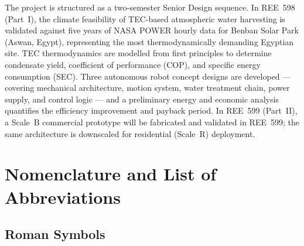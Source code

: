 \documentclass[12pt,a4paper]{report}
\numberwithin{equation}{chapter}
\numberwithin{figure}{chapter}
\numberwithin{table}{chapter}
\begin{document}
The project is structured as a two-semester Senior Design sequence. In REE~598
(Part~I), the climate feasibility of TEC-based atmospheric water harvesting is validated
against five years of NASA POWER hourly data for Benban Solar Park (Aswan, Egypt),
representing the most thermodynamically demanding Egyptian site. TEC thermodynamics are
modelled from first principles to determine condensate yield, coefficient of performance
(COP), and specific energy consumption (SEC). Three autonomous robot concept designs are
developed --- covering mechanical architecture, motion system, water treatment chain,
power supply, and control logic --- and a preliminary energy and economic analysis
quantifies the efficiency improvement and payback period. In REE~599 (Part~II), a
Scale~B commercial prototype will be fabricated and validated in REE~599; the same
architecture is downscaled for residential (Scale~R) deployment.

\newpage

\tableofcontents
\newpage
\listoffigures
{}
\newpage
\listoftables
{}
\newpage

\chapter*{Nomenclature and List of Abbreviations}
\thispagestyle{plain}

\section*{Roman Symbols}
\end{document}
